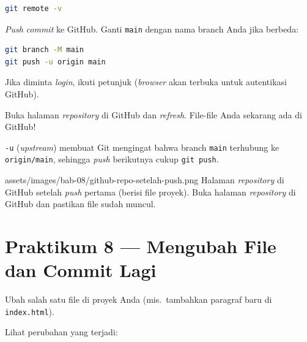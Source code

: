 \begin{lstlisting}[language=bash, caption={Memeriksa remote}, label={lst:git-remote-v}]
git remote -v
\end{lstlisting}

\begin{langkah}
  \item \emph{Push} \emph{commit} ke GitHub. Ganti \texttt{main} dengan nama branch Anda jika berbeda:
\end{langkah}

\begin{lstlisting}[language=bash, caption={Push ke GitHub}, label={lst:git-push}]
git branch -M main
git push -u origin main
\end{lstlisting}

\begin{langkah}
  \item Jika diminta \emph{login}, ikuti petunjuk (\emph{browser} akan terbuka untuk autentikasi GitHub).
  \item Buka halaman \emph{repository} di GitHub dan \emph{refresh}. File-file Anda sekarang ada di GitHub!
\end{langkah}

\begin{catatan}
\texttt{-u} (\emph{upstream}) membuat Git mengingat bahwa branch \texttt{main} terhubung ke \texttt{origin/main}, sehingga \emph{push} berikutnya cukup \texttt{git push}.
\end{catatan}

\begin{tangkapanlayar}
  {assets/images/bab-08/github-repo-setelah-push.png}
  {Halaman \emph{repository} di GitHub setelah \emph{push} pertama (berisi file proyek).}
  {Buka halaman \emph{repository} di GitHub dan pastikan file sudah muncul.}
\end{tangkapanlayar}

\section{Praktikum 8 --- Mengubah File dan Commit Lagi}
\label{sec:git-praktik-8}

\begin{langkah}
  \item Ubah salah satu file di proyek Anda (mis.\ tambahkan paragraf baru di \texttt{index.html}).
  \item Lihat perubahan yang terjadi:
\end{langkah}

